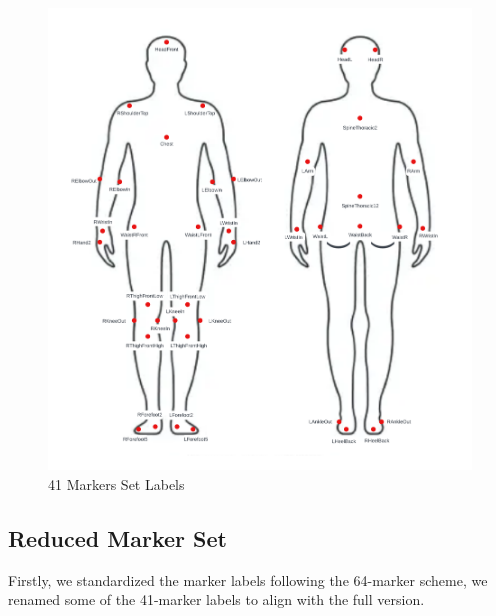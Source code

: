 \begin{figure}[H]
    \centering
    \includegraphics[width=\textwidth]{graphics/41Markers.png}
    \caption{41 Markers Set Labels}
    \label{fig:41markers}
\end{figure}



\subsection{Reduced Marker Set}
Firstly, we standardized the marker labels following the 64-marker scheme, 
we renamed some of the 41-marker labels to align with the full version.

